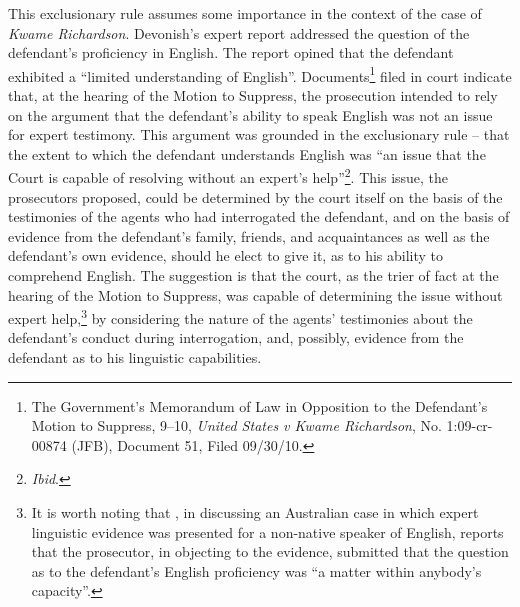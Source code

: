 \documentclass[output=paper,colorlinks,citecolor=brown]{langscibook}
\begin{document}
This exclusionary rule assumes some importance in the context of the case of \emph{Kwame Richardson}. Devonish’s expert report addressed the question of the defendant’s proficiency in English. The report opined that the defendant exhibited a “limited understanding of English”. Documents\footnote{The Government’s Memorandum of Law in Opposition to the Defendant’s Motion to Suppress, 9--10, \emph{United States v Kwame Richardson}, No. 1:09-cr-00874 (JFB), Document 51, Filed 09/30/10.} filed in court indicate that, at the hearing of the Motion to Suppress, the prosecution intended to rely on the argument that the defendant’s ability to speak English was not an issue for expert testimony. This argument was grounded in the exclusionary rule -- that the extent to which the defendant understands English was “an issue that the Court is capable of resolving without an expert’s help”\footnote{\emph{Ibid}.}. This issue, the prosecutors proposed, could be determined by the court itself on the basis of the testimonies of the agents who had interrogated the defendant, and on the basis of evidence from the defendant’s family, friends, and acquaintances as well as the defendant’s own evidence, should he elect to give it, as to his ability to comprehend English. The suggestion is that the court, as the trier of fact at the hearing of the Motion to Suppress, was capable of determining the issue without expert help,\footnote{It is worth noting that \citet[133]{Jensen1995}, in discussing an Australian case in which expert linguistic evidence was presented for a non-native speaker of English, reports that the prosecutor, in objecting to the evidence, submitted that the question as to the defendant’s English proficiency was “a matter within anybody’s capacity”.} by considering the nature of the agents’ testimonies about the defendant’s conduct during interrogation, and, possibly, evidence from the defendant as to his linguistic capabilities.  
\end{document}
